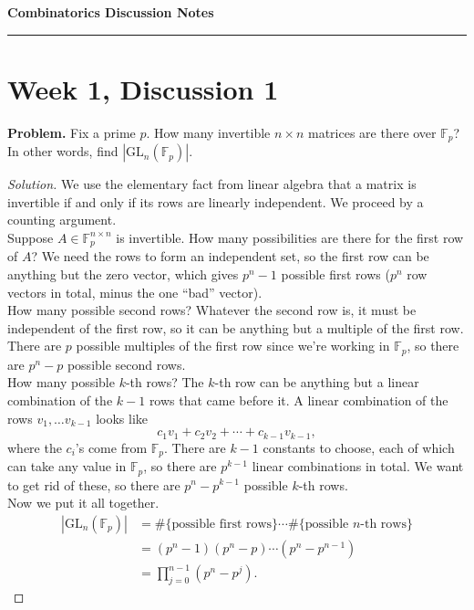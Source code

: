 \documentclass[11pt,letterpaper]{report}
\newcommand{\field}{\mathbb{F}}
\theoremstyle{definition}
\theoremstyle{remark}
\newenvironment{solution}
{\begin{proof}[Solution]}
{\end{proof}}
\begin{document}
\begin{center}
{\bf \Large Combinatorics Discussion Notes}
\vspace{0.2cm}
\hrule
\end{center}

\section{Week 1, Discussion 1}
\newcommand{\GL}{\text{GL}}
\newcommand{\SL}{\text{SL}}
\noindent\textbf{Problem. }Fix a prime $p$. How many invertible $n\times n$ matrices are there over $\field_p$? In other words, find $|\GL_n(\field_p)|$.
\begin{solution}
	We use the elementary fact from linear algebra that a matrix is invertible if and only if its rows are linearly independent. We proceed by a counting argument.\\

	\noindent Suppose $A\in \field_p^{n\times n}$ is invertible. How many possibilities are there for the first row of $A$? We need the rows to form an independent set, so the first row can be anything but the zero vector, which gives $p^n - 1$ possible first rows ($p^n$ row vectors in total, minus the one ``bad'' vector).\\

	\noindent How many possible second rows? Whatever the second row is, it must be independent of the first row, so it can be anything but a multiple of the first row. There are $p$ possible multiples of the first row since we're working in $\field_p$, so there are $p^n - p$ possible second rows.\\

	\noindent How many possible $k$-th rows? The $k$-th row can be anything but a linear combination of the $k-1$ rows that came before it. A linear combination of the rows $v_1, \ldots v_{k-1}$ looks like
	\[
	c_1v_1 + c_2v_2 + \cdots +c_{k-1}v_{k-1},
	\]
	where the $c_i$'s come from $\field_p$. There are $k-1$ constants to choose, each of which can take any value in $\field_p$, so there are $p^{k-1}$ linear combinations in total. We want to get rid of these, so there are $p^n - p^{k-1}$ possible $k$-th rows.\\

	\noindent Now we put it all together.
	\begin{align*}
	|\GL_n(\field_p)| &= \#\{\text{possible first rows}\} \cdots \#\{\text{possible $n$-th rows}\}\\
	&= (p^n-1)(p^n-p)\cdots (p^n-p^{n-1})\\
	&= \prod_{j=0}^{n-1}(p^n-p^j).
	\end{align*}


\end{solution}
\end{document}
